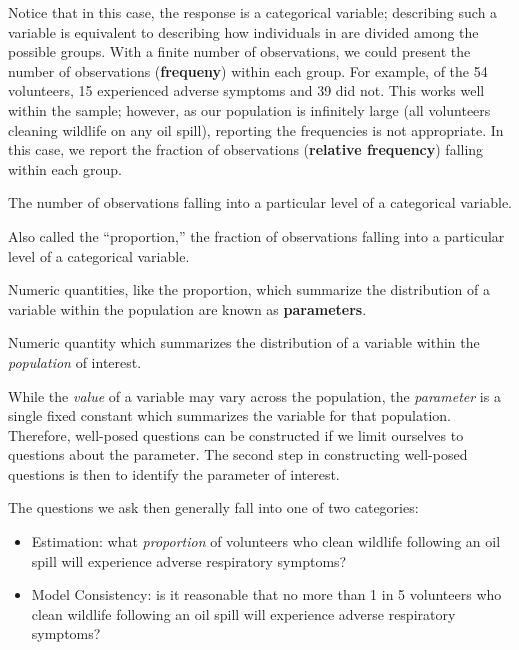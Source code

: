 \documentclass[]{book}
\providecommand{\tightlist}{%
  \setlength{\itemsep}{0pt}\setlength{\parskip}{0pt}}
\theoremstyle{definition}
\theoremstyle{definition}
\theoremstyle{remark}
\let\BeginKnitrBlock\begin \let\EndKnitrBlock\end
\begin{document}
Notice that in this case, the response is a categorical variable;
describing such a variable is equivalent to describing how individuals
in are divided among the possible groups. With a finite number of
observations, we could present the number of observations
(\textbf{frequeny}) within each group. For example, of the 54
volunteers, 15 experienced adverse symptoms and 39 did not. This works
well within the sample; however, as our population is infinitely large
(all volunteers cleaning wildlife on any oil spill), reporting the
frequencies is not appropriate. In this case, we report the fraction of
observations (\textbf{relative frequency}) falling within each group.

\BeginKnitrBlock{definition}[Frequency]
\protect\hypertarget{def:defn-frequency}{}{\label{def:defn-frequency}
{} }The number of observations falling into a
particular level of a categorical variable.
\EndKnitrBlock{definition}

\BeginKnitrBlock{definition}[Relative Frequency]
\protect\hypertarget{def:defn-relative-frequency}{}{\label{def:defn-relative-frequency}
{} }Also called the ``proportion,'' the
fraction of observations falling into a particular level of a
categorical variable.
\EndKnitrBlock{definition}

Numeric quantities, like the proportion, which summarize the
distribution of a variable within the population are known as
\textbf{parameters}.

\BeginKnitrBlock{definition}[Parameter]
\protect\hypertarget{def:defn-parameter}{}{\label{def:defn-parameter}
{} }Numeric quantity which summarizes the
distribution of a variable within the \emph{population} of interest.
\EndKnitrBlock{definition}

While the \emph{value} of a variable may vary across the population, the
\emph{parameter} is a single fixed constant which summarizes the
variable for that population. Therefore, well-posed questions can be
constructed if we limit ourselves to questions about the parameter. The
second step in constructing well-posed questions is then to identify the
parameter of interest.

The questions we ask then generally fall into one of two categories:

\begin{itemize}
\tightlist
\item
  Estimation: what \emph{proportion} of volunteers who clean wildlife
  following an oil spill will experience adverse respiratory symptoms?
\item
  Model Consistency: is it reasonable that no more than 1 in 5
  volunteers who clean wildlife following an oil spill will experience
  adverse respiratory symptoms?
\end{itemize}
\end{document}
